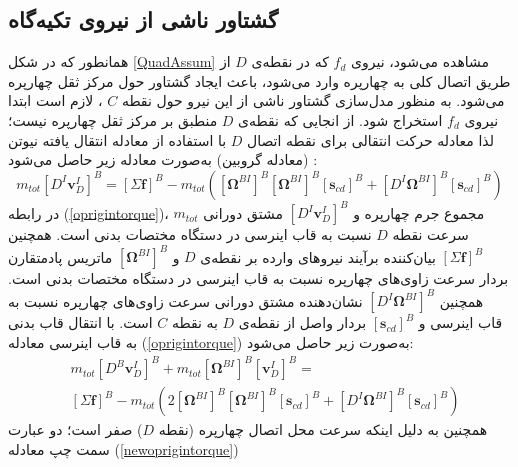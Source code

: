 \subsection{گشتاور ناشی از نیروی تكیه‌گاه}\label{sec:edgemoment}
همانطور که در شكل \ref{QuadAssum} مشاهده می‌شود، نیروی
$f_d$
که در نقطه‌ی 
$D$
از طریق اتصال کلی به چهارپره وارد می‌شود، باعث ایجاد گشتاور حول مرکز ثقل چهارپره می‌شود. به منظور مدل‌سازی گشتاور ناشی از این نیرو حول نقطه
$C$
، لازم است ابتدا نیروی
$f_d$
استخراج شود. از انجایی که نقطه‌ی
$D$
منطبق بر مرکز ثقل چهارپره نیست؛ لذا معادله حرکت انتقالی برای نقطه اتصال
$D$
با استفاده از معادله انتقال یافته نیوتن (معادله گروبین) به‌صورت معادله زیر حاصل می‌شود
\cite{zipfel2000modeling}
:
\begin{equation}\label{oprigintorque}
	m_{tot} \left[D^I\boldsymbol v_D^I\right]^B = 
	\left[\Sigma \boldsymbol f\right]^B-m_{tot}\left(
	\left[\boldsymbol \Omega^{BI}\right]^B
	\left[\boldsymbol\Omega^{BI}\right]^B
	\left[\boldsymbol s_{cd}\right]^B+
	\left[D^I\boldsymbol\Omega^{BI}\right]^B
	\left[\boldsymbol s_{cd}\right]^B
	\right)
\end{equation}
در رابطه
(\ref{oprigintorque})، 
$m_{tot}$
مجموع جرم چهارپره و 
$\left[D^I\boldsymbol v_D^I\right]^B$
مشتق دورانی سرعت نقطه
$D$
نسبت به قاب اینرسی در دستگاه مختصات بدنی است. همچنین
$\left[\Sigma \boldsymbol f\right]^B$
بیان‌کننده برآیند نیروهای وارده بر نقطه‌ی
$D$
و
$\left[\boldsymbol\Omega^{BI}\right]^B$
ماتریس پادمتقارن بردار سرعت زاوی‌های چهارپره نسبت به قاب اینرسی در دستگاه مختصات بدنی است. همچنین
$\left[D^I\boldsymbol \Omega^{BI}\right]^B$
نشان‌دهنده مشتق دورانی سرعت زاوی‌های چهارپره نسبت به قاب اینرسی و 
$\left[\boldsymbol s_{cd}\right]^B$
بردار واصل از نقطه‌ی
$D$
به نقطه
$C$
است. با انتقال قاب بدنی به قاب اینرسی معادله 
(\ref{oprigintorque})
به‌صورت زیر حاصل می‌شود:
\begin{equation}
\begin{split}\label{newoprigintorque}
	&m_{tot} \left[D^B\boldsymbol v_D^I\right]^B +
	m_{tot}\left[\boldsymbol\Omega^{BI}\right]^B
	\left[\boldsymbol v_D^{I}\right]^B = \\
	&\left[\Sigma \boldsymbol f\right]^B-m_{tot}\left(2
	\left[\boldsymbol\Omega^{BI}\right]^B
	\left[\boldsymbol\Omega^{BI}\right]^B
	\left[\boldsymbol s_{cd}\right]^B+
	\left[D^I\boldsymbol\Omega^{BI}\right]^B
	\left[\boldsymbol s_{cd}\right]^B
	\right)
\end{split}
\end{equation}
همچنین به دلیل اینكه سرعت محل اتصال چهارپره (نقطه
$D$)
صفر است؛ دو عبارت سمت چپ معادله
(\ref{newoprigintorque}) 
